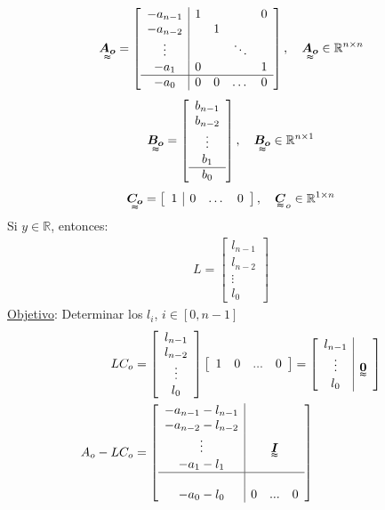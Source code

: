 \begin{align*}
\tenq{A_o}=\left[
    \begin{array}{c|cccc}
     -a_{n-1} & 1 & & & 0 \\ 
     -a_{n-2} & & 1 & & \\
     \vdots   & & & \ddots & \\
     -a_1     & 0 & & & 1 \\ \hline
     -a_0     & 0 & 0 & \dots & 0   
    \end{array}\right], \quad \tenq{A_o}\in \mathbb{R}^{n\times n}
\end{align*}
\begin{align*}
\tenq{B_o}=\left[
    \begin{array}{c}
     b_{n-1} \\
     b_{n-2}\\
    \vdots\\
     b_1 \\ \hline
     b_0
    \end{array}\right], \quad \tenq{B_o}\in \mathbb{R}^{n\times 1}
\end{align*}
\begin{align*}
\tenq{C_o}=\left[
    \begin{array}{c|ccc}
     1 & 0 & \dots & 0
    \end{array}\right], \quad \tenq{C}_o\in \mathbb{R}^{1\times n}
\end{align*}
Si $y\in\mathbb{R}$, entonces:
\begin{align*}
    L=\left[
    \begin{array}{c}
     l_{n-1} \\ l_{n-2}\\ \vdots\\ l_0 
    \end{array}\right] 
\end{align*}
\underline{Objetivo}: Determinar los $l_i$, $i\in[0,n-1]$
\begin{align*}
    LC_o&=\left[
    \begin{array}{c}
     l_{n-1} \\ l_{n-2}\\ \vdots\\ l_0 
    \end{array}\right] \left[
    \begin{array}{c c c c}
     1 & 0 & ... & 0
    \end{array}\right] =\left[
    \begin{array}{c|c}
     l_{n-1} & \\ \vdots & \tenq{0} \\ l_0 & 
    \end{array}\right] \\
    A_o-LC_o &= \left[ \begin{array}{c|c c c}
     -a_{n-1}-l_{n-1} & & & \\  -a_{n-2}-l_{n-2} & & & \\ \vdots & & \tenq{I} & \\-a_1-l_1 & & & \\ \hline \\ -a_0-l_0 & 0 & ... & 0
    \end{array}\right] 
\end{align*}
